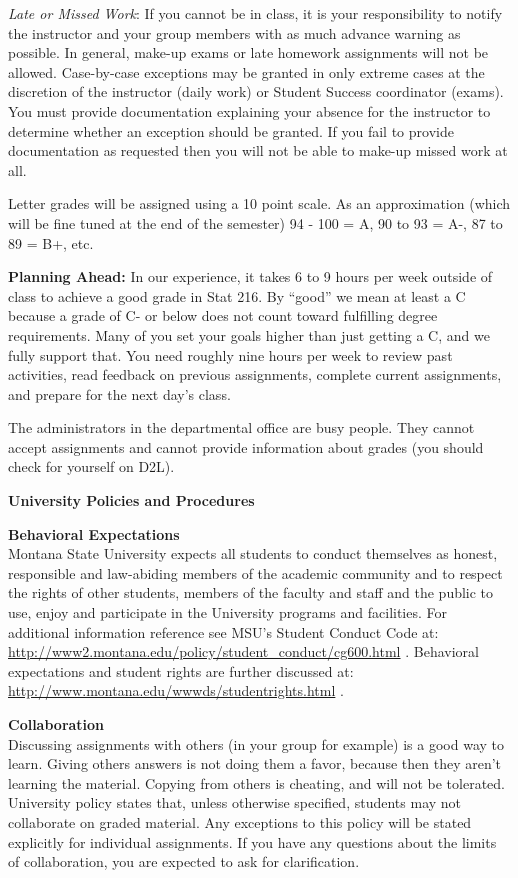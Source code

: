 {\it Late or Missed Work}:  If you cannot be in class, it is your 
responsibility to notify the instructor and your group members with as
much advance warning as possible. In general, make-up exams or late
homework assignments will not be allowed. Case-by-case exceptions may
be granted in only extreme cases at the discretion of the
instructor (daily work) or Student Success coordinator (exams). You
must provide documentation explaining your absence for 
the instructor to determine whether an exception should be granted. If
you fail to provide documentation as requested then you will not be
able to make-up missed work at all.   
 
  Letter grades will be assigned using a 10 point scale.
  As an approximation (which will be fine tuned at the end of the semester)
  94 - 100 = A,  90 to 93 = A-, 87 to 89 = B+, etc.
 
{\bf Planning Ahead:}  In our experience, it takes 6 to 9 hours per
week outside of class to achieve a good grade in Stat 216.  By ``good'' we
mean at least a C because a grade of C- or below does not
count toward fulfilling degree requirements.  Many of you set your
goals higher than just getting a C, and we fully support that.  You
need roughly nine hours per week to  review past activities, read
feedback on previous assignments, complete current assignments, and
prepare for the next day's class. 


The administrators in the departmental office are  busy
people. They cannot accept assignments and cannot provide information
about grades (you should check for yourself on D2L).


\begin{center}
{\large\bf University Policies and Procedures }  
\end{center}

{\bf Behavioral Expectations }\\
Montana State University expects all students to conduct themselves as
honest, responsible and law-abiding members of the academic community
and to respect the rights of other students, members of the faculty
and staff and the public to use, enjoy and participate in the
University programs and facilities. For additional information
reference see MSU's Student Conduct Code at: 
\url{http://www2.montana.edu/policy/student_conduct/cg600.html} .
Behavioral expectations and student rights are further discussed at:
\url{http://www.montana.edu/wwwds/studentrights.html} . 
 

 {\bf Collaboration }\\
Discussing assignments with others (in your group for example) is a
good way to learn.  Giving others answers is not doing them a favor,
because then they aren't learning the material.  Copying from others
is cheating, and will not be tolerated.  
University policy states that, unless otherwise specified, students
may not collaborate on graded material. Any exceptions to this policy
will be stated explicitly for individual assignments. If you have any
questions about the limits of collaboration, you are expected to ask
for clarification. 


